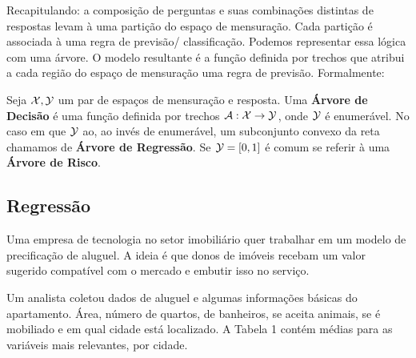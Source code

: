 Recapitulando: a composição de perguntas e suas combinações distintas de respostas levam à uma partição do espaço de mensuração. Cada partição é associada à uma regra de previsão/ classificação. Podemos representar essa lógica com uma árvore. O modelo resultante é a função definida por trechos que atribui a cada região do espaço de mensuração uma regra de previsão. Formalmente:


\begin{defi}
Seja $\mathcal{X}, \mathcal{Y}$ um par de espaços de mensuração e resposta. Uma \textbf{Árvore de Decisão} é uma função definida por trechos $\mathcal{A}: \mathcal{X} \to \mathcal{Y}$, onde $\mathcal{Y}$ é enumerável. No caso em que $\mathcal{Y}$ ao, ao invés de enumerável, um subconjunto convexo da reta chamamos de \textbf{Árvore de Regressão}. Se $\mathcal{Y} = [0, 1]$ é comum se referir à uma \textbf{Árvore de Risco}.
\end{defi}


\subsection{Regressão}

Uma empresa de tecnologia no setor imobiliário quer trabalhar em um modelo de precificação de aluguel. A ideia é que donos de imóveis recebam um valor sugerido compatível com o mercado e embutir isso no serviço.
 
 Um analista coletou dados de aluguel e algumas informações básicas do apartamento. Área, número de quartos, de banheiros, se aceita animais, se é mobiliado e em qual cidade está localizado. A Tabela 1 contém médias para as variáveis mais relevantes, por cidade.
 
 



 
\begin{figure}[H]
    \centering
        \label{fig:arvore_reg}
\end{figure}

